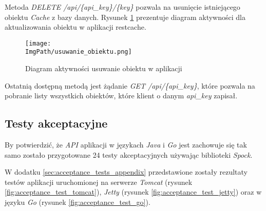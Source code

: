 Metoda \textsl{DELETE /api/\{api\_key\}/\{key\}} pozwala na usunięcie istniejącego obiektu \textsl{Cache} z bazy danych. Rysunek \ref{fig:usuwanie_obiektu} prezentuje diagram aktywności dla aktualizowania obiektu w aplikacji restcache.
\begin{figure}[!ht]
\centering
\texttt{[image: \\ImgPath/usuwanie\_obiektu.png]}
\caption{Diagram aktywności usuwanie obiektu w aplikacji}
\label{fig:usuwanie_obiektu}
\end{figure}

Ostatnią dostępną metodą jest żądanie \textsl{GET /api/\{api\_key\}}, które pozwala na pobranie listy wszystkich obiektów, które klient o danym \textsl{api\_key} zapisał.

\subsection{Testy akceptacyjne} 

By potwierdzić, że \textsl{API} aplikacji w językach \textsl{Java} i \textsl{Go} jest zachowuje się tak samo zostało przygotowane 24 testy akceptacyjnych używając biblioteki \textsl{Spock}. 

W dodatku \ref{sec:acceptance_tests_appendix} przedstawione zostały rezultaty testów aplikacji uruchomionej na serwerze \textsl{Tomcat} (rysunek \ref{fig:acceptance_test_tomcat}), \textsl{Jetty} (rysunek \ref{fig:acceptance_test_jetty}) oraz w języku \textsl{Go} (rysunek \ref{fig:acceptance_test_go}).

